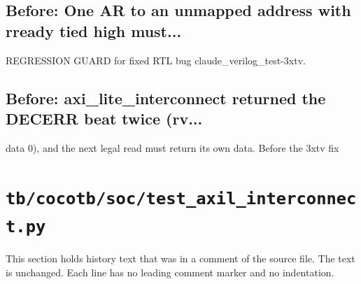 \begin{record}

\subsection*{Before: One AR to an unmapped address with rready tied high must...}

\begin{textblock}
REGRESSION GUARD for fixed RTL bug claude_verilog_test-3xtv.
\end{textblock}

\subsection*{Before: axi\_lite\_interconnect returned the DECERR beat twice (rv...}

\begin{textblock}
data 0), and the next legal read must return its own data.  Before the 3xtv fix
\end{textblock}

\end{record}

\section{\texttt{tb/cocotb/soc/test\_axil\_interconnect.py}}\label{cr:suite:soc-test-axil-interconnect}

This section holds history text that was in a comment of the source file. The text is unchanged. Each line has no leading comment marker and no indentation.

